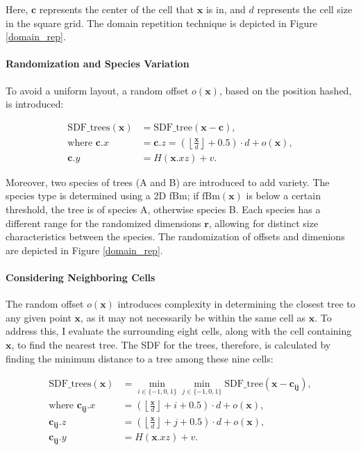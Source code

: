 Here, $\mathbf{c}$ represents the center of the cell that $\mathbf{x}$ is in, and $d$ represents the cell size in the square grid. The domain repetition technique is depicted in Figure \ref{domain_rep}.

\paragraph{Randomization and Species Variation}
To avoid a uniform layout, a random offset $o(\mathbf{x})$, based on the position hashed, is introduced:

\begin{equation}
\begin{aligned}
\text{SDF\_trees}(\mathbf{x}) &= \text{SDF\_tree}(\mathbf{x} - \mathbf{c}), \\
\text{where } \mathbf{c}.x &= \mathbf{c}.z = \left(\left\lfloor \frac{\mathbf{x}}{d} \right\rfloor + 0.5\right) \cdot d + o(\mathbf{x}), \\
\mathbf{c}.y &= H(\mathbf{x}.{xz}) + v.
\end{aligned}
\end{equation}

Moreover, two species of trees (A and B) are introduced to add variety. The species type is determined using a 2D fBm; if $\text{fBm}(\mathbf{x})$ is below a certain threshold, the tree is of species A, otherwise species B. Each species has a different range for the randomized dimensions $\mathbf{r}$, allowing for distinct size characteristics between the species. The randomization of offsets and dimenions are depicted in Figure \ref{domain_rep}.

\paragraph{Considering Neighboring Cells}
The random offset $o(\mathbf{x})$ introduces complexity in determining the closest tree to any given point $\mathbf{x}$, as it may not necessarily be within the same cell as $\mathbf{x}$. To address this, I evaluate the surrounding eight cells, along with the cell containing $\mathbf{x}$, to find the nearest tree. The SDF for the trees, therefore, is calculated by finding the minimum distance to a tree among these nine cells:

\begin{equation}
\begin{aligned}
\text{SDF\_trees}(\mathbf{x}) &= \min_{i\in\{-1,0,1\}}\min_{j\in\{-1,0,1\}}\text{SDF\_tree}(\mathbf{x} - \mathbf{c_{ij}}), \\
\text{where } \mathbf{c_{ij}}.x & = \left(\left\lfloor \frac{\mathbf{x}}{d} \right\rfloor + i + 0.5\right) \cdot d + o(\mathbf{x}), \\
\mathbf{c_{ij}}.z & = \left(\left\lfloor \frac{\mathbf{x}}{d} \right\rfloor + j + 0.5\right) \cdot d + o(\mathbf{x}), \\
\mathbf{c_{ij}}.y &= H(\mathbf{x}.{xz}) + v.
\end{aligned}
\end{equation}

